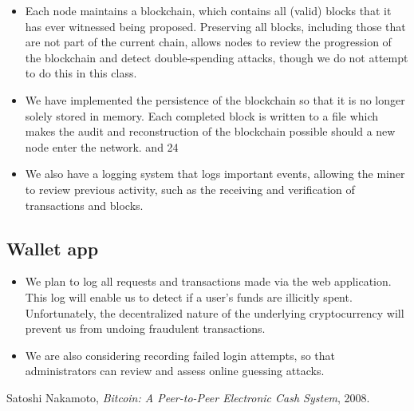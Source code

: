 \documentclass[a4paper,12pt]{article}
\begin{document}
\begin{itemize}
	\item Each node maintains a blockchain, which contains all (valid) blocks that it has ever witnessed being proposed.
	Preserving all blocks, including those that are not part of the current chain, allows nodes to review the progression of the blockchain and detect double-spending attacks, though we do not attempt to do this in this class.
	\begin{comment}
	\item Miners heavily audit the work of other miners in order to maintain the integrity of the blockchain.
	\item For each block a miner receives (or broadcasts), its hash will be checked to see if it satisfies a set difficulty.
	\item Every transaction inside of the block is verified by checking that each input has a corresponding unspent output (UTXO), that the signature for each input was signed with the private key corresponding to the public key on the previous UTXO, and that the sum of the input amounts (from the UTXO's) is equal to the sum of the outputs.
	\item If either of these checks fail, the potential new block will be rejected.
	\item So long as an adversary does not control a majority of nodes in the network, blocks will not be added to the blockchain that are not correct.
	\end{comment}
	\item We have implemented the persistence of the blockchain so that it is no longer solely stored in memory.
	Each completed block is written to a file which makes the audit and reconstruction of the blockchain possible should a new node enter the network. and 24
	\item We also have a logging system that logs important events, allowing the miner to review previous activity, such as the receiving and verification of transactions and blocks. %
\end{itemize}

\subsection{Wallet app}

\begin{itemize}
	\item We plan to log all requests and transactions made via the web application. 
	This log will enable us to detect if a user's funds are illicitly spent. Unfortunately, the decentralized nature of the underlying cryptocurrency will prevent us from undoing fraudulent transactions.
	\item We are also considering recording failed login attempts, so that administrators can review and assess online guessing attacks. %
\end{itemize}


\begin{thebibliography}{9}
	Satoshi Nakamoto,
	\emph{Bitcoin: A Peer-to-Peer Electronic Cash System},
	2008.
\end{thebibliography}
\end{document}
